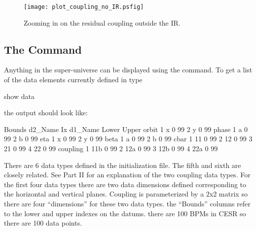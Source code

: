 \begin{figure}
  \centering
  \texttt{[image: plot\_coupling\_no\_IR.psfig]}
  \caption{Zooming in on the residual coupling outside the IR.}
  \label{f:plot_coupling_no_IR}
\end{figure}

\subsection{The  Command}

Anything in the super-universe can be displayed using the 
command. To get a list of the data elements currently defined in \tao
type
\begin{example}
  show data
\end{example}
the output should look like:
\begin{example}
                                                              Bounds
     d2\_Name                       Ix  d1\_Name              Lower  Upper
     orbit
                                    1  x                      0    99
                                    2  y                      0    99
     phase
                                    1  a                      0    99
                                    2  b                      0    99
     eta
                                    1  x                      0    99
                                    2  y                      0    99
     beta
                                    1  a                      0    99
                                    2  b                      0    99
     cbar
                                    1  11                     0    99
                                    2  12                     0    99
                                    3  21                     0    99
                                    4  22                     0    99
     coupling
                                    1  11b                    0    99
                                    2  12a                    0    99
                                    3  12b                    0    99
                                    4  22a                    0    99

\end{example}
There are 6 data types defined in the initialization file. The fifth
and sixth are closely related. See Part II for an explanation of the
two coupling data types.  For the first four data types there are two
data dimensions defined corresponding to the horizontal and vertical
planes. Coupling is parameterized by a 2x2 matrix so there are four
``dimensions'' for these two data types. the ``Bounds'' columns refer
to the lower and upper indexes on the datums. there are 100 BPMs in
CESR so there are 100 data points.

